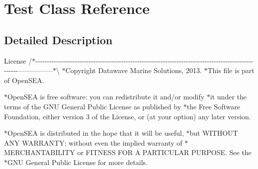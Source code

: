 \hypertarget{class_test}{\section{Test Class Reference}
\label{class_test}
}


\subsection{Detailed Description}
License /$\ast$-\/-\/-\/-\/-\/-\/-\/-\/-\/-\/-\/-\/-\/-\/-\/-\/-\/-\/-\/-\/-\/-\/-\/-\/-\/-\/-\/-\/-\/-\/-\/-\/-\/-\/-\/-\/-\/-\/-\/-\/-\/-\/-\/-\/-\/-\/-\/-\/-\/-\/-\/-\/-\/-\/-\/-\/-\/-\/-\/-\/-\/-\/-\/-\/-\/-\/-\/-\/-\/-\/-\/-\/-\/-\/-\/-\/-\/-\/-\/-\/-\/-\/-\/-\/-\/-\/-\/-\/-\/-\/-\/-\/-\/-\/-\/-\/-\/-\/-\/-\/---------------$\ast$\textbackslash{} $\ast$\-Copyright Datawave Marine Solutions, 2013. $\ast$\-This file is part of Open\-S\-E\-A.

$\ast$\-Open\-S\-E\-A is free software\-: you can redistribute it and/or modify $\ast$it under the terms of the G\-N\-U General Public License as published by $\ast$the Free Software Foundation, either version 3 of the License, or (at your option) any later version.

$\ast$\-Open\-S\-E\-A is distributed in the hope that it will be useful, $\ast$but W\-I\-T\-H\-O\-U\-T A\-N\-Y W\-A\-R\-R\-A\-N\-T\-Y; without even the implied warranty of $\ast$\-M\-E\-R\-C\-H\-A\-N\-T\-A\-B\-I\-L\-I\-T\-Y or F\-I\-T\-N\-E\-S\-S F\-O\-R A P\-A\-R\-T\-I\-C\-U\-L\-A\-R P\-U\-R\-P\-O\-S\-E. See the $\ast$\-G\-N\-U General Public License for more details.

